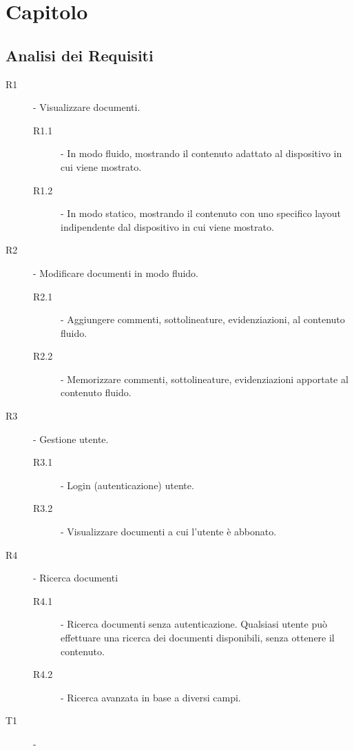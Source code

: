 \newpage
\chapter{Capitolo}

\section{Analisi dei Requisiti}
\begin{description}
    \item[R1] - Visualizzare documenti.
    \begin{description}
        \item[R1.1] - In modo fluido, mostrando il contenuto adattato al dispositivo in cui viene mostrato.
        \item[R1.2] - In modo statico, mostrando il contenuto con uno specifico layout indipendente dal dispositivo in cui viene mostrato.
    \end{description}
    \item[R2] - Modificare documenti in modo fluido.
    \begin{description}
        \item[R2.1] - Aggiungere commenti, sottolineature, evidenziazioni, al contenuto fluido.
        \item[R2.2] - Memorizzare commenti, sottolineature, evidenziazioni apportate al contenuto fluido.
    \end{description}
    \item[R3] - Gestione utente.
    \begin{description}
        \item[R3.1] - Login (autenticazione) utente.
        \item[R3.2] - Visualizzare documenti a cui l'utente è abbonato.
    \end{description}
    \item[R4] - Ricerca documenti
    \begin{description}
        \item[R4.1] - Ricerca documenti senza autenticazione. Qualsiasi utente può effettuare una ricerca dei documenti disponibili, senza ottenere il contenuto.
        \item[R4.2] - Ricerca avanzata in base a diversi campi. %
    \end{description}
\end{description}


\begin{description}
    \item[T1] - 
\end{description}